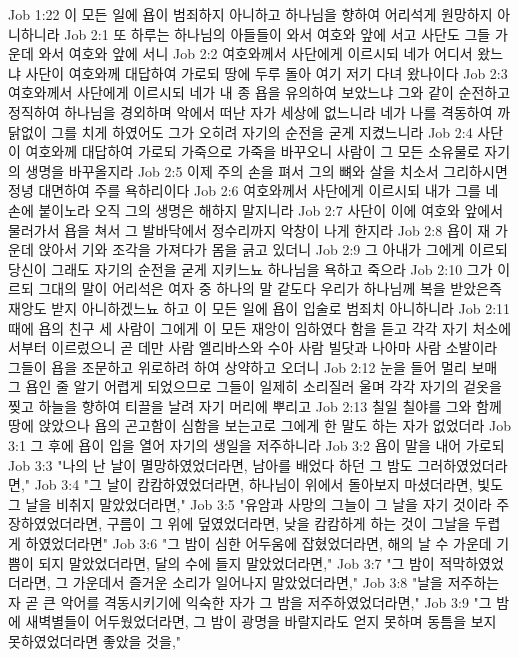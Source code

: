 Job 1:22  이 모든 일에 욥이 범죄하지 아니하고 하나님을 향하여 어리석게 원망하지 아니하니라
Job 2:1  또 하루는 하나님의 아들들이 와서 여호와 앞에 서고 사단도 그들 가운데 와서 여호와 앞에 서니
Job 2:2  여호와께서 사단에게 이르시되 네가 어디서 왔느냐 사단이 여호와께 대답하여 가로되 땅에 두루 돌아 여기 저기 다녀 왔나이다
Job 2:3  여호와께서 사단에게 이르시되 네가 내 종 욥을 유의하여 보았느냐 그와 같이 순전하고 정직하여 하나님을 경외하며 악에서 떠난 자가 세상에 없느니라 네가 나를 격동하여 까닭없이 그를 치게 하였어도 그가 오히려 자기의 순전을 굳게 지켰느니라
Job 2:4  사단이 여호와께 대답하여 가로되 가죽으로 가죽을 바꾸오니 사람이 그 모든 소유물로 자기의 생명을 바꾸올지라
Job 2:5  이제 주의 손을 펴서 그의 뼈와 살을 치소서 그리하시면 정녕 대면하여 주를 욕하리이다
Job 2:6  여호와께서 사단에게 이르시되 내가 그를 네 손에 붙이노라 오직 그의 생명은 해하지 말지니라
Job 2:7  사단이 이에 여호와 앞에서 물러가서 욥을 쳐서 그 발바닥에서 정수리까지 악창이 나게 한지라
Job 2:8  욥이 재 가운데 앉아서 기와 조각을 가져다가 몸을 긁고 있더니
Job 2:9  그 아내가 그에게 이르되 당신이 그래도 자기의 순전을 굳게 지키느뇨 하나님을 욕하고 죽으라
Job 2:10  그가 이르되 그대의 말이 어리석은 여자 중 하나의 말 같도다 우리가 하나님께 복을 받았은즉 재앙도 받지 아니하겠느뇨 하고 이 모든 일에 욥이 입술로 범죄치 아니하니라
Job 2:11  때에 욥의 친구 세 사람이 그에게 이 모든 재앙이 임하였다 함을 듣고 각각 자기 처소에서부터 이르렀으니 곧 데만 사람 엘리바스와 수아 사람 빌닷과 나아마 사람 소발이라 그들이 욥을 조문하고 위로하려 하여 상약하고 오더니
Job 2:12  눈을 들어 멀리 보매 그 욥인 줄 알기 어렵게 되었으므로 그들이 일제히 소리질러 울며 각각 자기의 겉옷을 찢고 하늘을 향하여 티끌을 날려 자기 머리에 뿌리고
Job 2:13  칠일 칠야를 그와 함께 땅에 앉았으나 욥의 곤고함이 심함을 보는고로 그에게 한 말도 하는 자가 없었더라
Job 3:1  그 후에 욥이 입을 열어 자기의 생일을 저주하니라
Job 3:2  욥이 말을 내어 가로되
Job 3:3  "나의 난 날이 멸망하였었더라면, 남아를 배었다 하던 그 밤도 그러하였었더라면,"
Job 3:4  "그 날이 캄캄하였었더라면, 하나님이 위에서 돌아보지 마셨더라면, 빛도 그 날을 비취지 말았었더라면,"
Job 3:5  "유암과 사망의 그늘이 그 날을 자기 것이라 주장하였었더라면, 구름이 그 위에 덮였었더라면, 낮을 캄캄하게 하는 것이 그날을 두렵게 하였었더라면"
Job 3:6  "그 밤이 심한 어두움에 잡혔었더라면, 해의 날 수 가운데 기쁨이 되지 말았었더라면, 달의 수에 들지 말았었더라면,"
Job 3:7  "그 밤이 적막하였었더라면, 그 가운데서 즐거운 소리가 일어나지 말았었더라면,"
Job 3:8  "날을 저주하는 자 곧 큰 악어를 격동시키기에 익숙한 자가 그 밤을 저주하였었더라면,"
Job 3:9  "그 밤에 새벽별들이 어두웠었더라면, 그 밤이 광명을 바랄지라도 얻지 못하며 동틈을 보지 못하였었더라면 좋았을 것을,"
